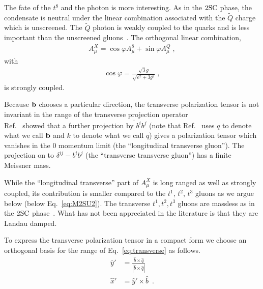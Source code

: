 \documentclass[10pt, aps, prd, superscriptaddress, nofootinbib, 
               amsmath, amssymb, twocolumn,
               preprintnumbers, showpacs,
               raggedbottom,
               floatfix]{revtex4-1}
\newcommand{\bfb}{{\bf{b}}}
\newcommand{\SC}{{\rm{SC}}}
\begin{document}
The fate of the $t^8$ and the photon is more interesting.  As in the $2\SC$
phase, the condensate is neutral under the linear combination associated with
the $\tilde{Q}$ charge which is unscreened. The $\tilde{Q}$ photon is weakly
coupled to the quarks and is less important than the unscreened 
gluons~\cite{Rajagopal:2000wf}. The orthogonal linear
combination,
\begin{equation}
\begin{split}
A_\mu^X = \cos\varphi A_\mu^8 +\sin\varphi A_\mu^Q\;,
\end{split}
\end{equation}
with 
\begin{equation}
\begin{split}
\cos\varphi= \frac{\sqrt{3}g}{\sqrt{e^2+3g^2}}\;,
\end{split}
\end{equation}
is strongly coupled.

Because $\bfb$ chooses a particular direction, the transverse polarization
tensor is not invariant in the range of the transverse projection operator 
\begin{equation}
[\delta_{ij}-\hat{q}_i\hat{q}_j]~\label{eq:transverse}\;.
\end{equation}
Ref.~\cite{Giannakis:2005vw} showed that a further projection by $b^ib^j$ (note
that Ref.~\cite{Giannakis:2005vw} uses $q$ to denote what we call $\bfb$ and $k$ to
denote what we call $q$) gives a polarization tensor which vanishes in the
$0$ momentum limit (the ``longitudinal transverse gluon''). The
projection on to $\delta^{ij}-b^ib^j$ (the ``transverse transverse gluon'')
has a finite Meissner mass.

While the ``longitudinal transverse'' part of $A_\mu^X$ is long ranged as well
as strongly coupled, its contribution is smaller compared to the $t^1$, $t^2$,
$t^3$ gluons as we argue below (below Eq.~\ref{eq:M2SU2}). The transverse $t^1, t^2, t^3$ gluons are massless as in the $2\SC$
phase~\cite{Casalbuoni:2002my,Giannakis:2005vw}. What has not been appreciated
in the literature is that they are Landau damped. 

To express the transverse polarization tensor in a compact form we
choose an orthogonal basis for the range of Eq.~\ref{eq:transverse} as follows.
\begin{equation}
\begin{split}
\hat{y}'&= \frac{\hat{b}\times\hat{q}}{|\hat{b}\times\hat{q}|}\\
\hat{x}'&= \hat{y}'\times\hat{b}~\label{eq:xyprime}\;. 
\end{split}
\end{equation}
\end{document}

